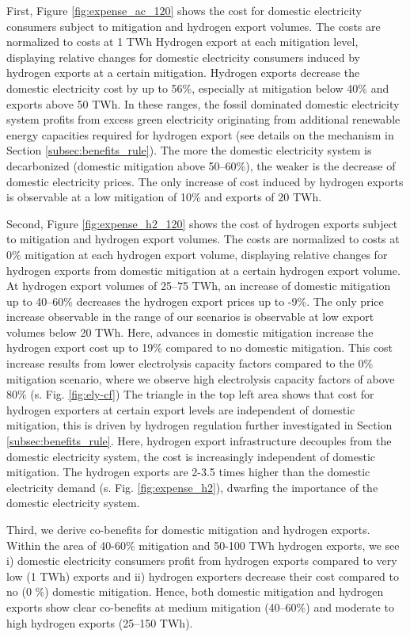 First, Figure \ref{fig:expense_ac_120} shows the cost for domestic electricity consumers subject to mitigation and hydrogen export volumes. The costs are normalized to costs at 1 TWh Hydrogen export at each mitigation level, displaying relative changes for domestic electricity consumers induced by hydrogen exports at a certain mitigation.
Hydrogen exports decrease the domestic electricity cost by up to 56\%, especially at mitigation below 40\% and exports above 50 TWh. In these ranges, the fossil dominated domestic electricity system profits from excess green electricity originating from additional renewable energy capacities required for hydrogen export (see details on the mechanism in Section \ref{subsec:benefits_rule}). The more the domestic electricity system is decarbonized (domestic mitigation above 50--60\%), the weaker is the decrease of domestic electricity prices.
The only increase of cost induced by hydrogen exports is observable at a low mitigation of 10\% and exports of 20 TWh. 

Second, Figure \ref{fig:expense_h2_120} shows the cost of hydrogen exports subject to mitigation and hydrogen export volumes. The costs are normalized to costs at 0\% mitigation at each hydrogen export volume, displaying relative changes for hydrogen exports from domestic mitigation at a certain hydrogen export volume.
At hydrogen export volumes of 25--75 TWh, an increase of domestic mitigation up to 40--60\% decreases the hydrogen export prices up to -9\%. 
The only price increase observable in the range of our scenarios is observable at low export volumes below 20 TWh. Here, advances in domestic mitigation increase the hydrogen export cost up to 19\% compared to no domestic mitigation.
This cost increase results from lower electrolysis capacity factors compared to the 0\% mitigation scenario, where we observe high electrolysis capacity factors of above 80\% (s. Fig. \ref{fig:ely-cf})
The triangle in the top left area shows that cost for hydrogen exporters at certain export levels are independent of domestic mitigation, this is driven by hydrogen regulation further investigated in Section \ref{subsec:benefits_rule}. Here, hydrogen export infrastructure decouples from the domestic electricity system, the cost is increasingly independent of domestic mitigation. The hydrogen exports are 2-3.5 times higher than the domestic electricity demand (s. Fig. \ref{fig:expense_h2}), dwarfing the importance of the domestic electricity system.


Third, we derive co-benefits for domestic mitigation and hydrogen exports. 
Within the area of 40-60\% mitigation and 50-100 TWh hydrogen exports, we see i) domestic electricity consumers profit from hydrogen exports compared to very low (1 TWh) exports and ii) hydrogen exporters decrease their cost compared to no (0 \%) domestic mitigation. Hence, both domestic mitigation and hydrogen exports show clear co-benefits at medium mitigation (40--60\%) and moderate to high hydrogen exports (25--150 TWh). 


